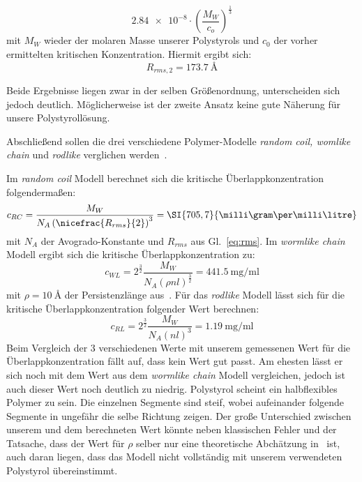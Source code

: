 \begin{equation}
    \num{2,84e-8} \cdot \left(\frac{M_W}{c_o}\right)^\frac{1}{3}
\end{equation}
mit $M_W$ wieder der molaren Masse unserer Polystyrols und $c_0$ der vorher ermittelten kritischen Konzentration. Hiermit ergibt sich:
\begin{equation*}
    R_{rms, 2} = \SI{173,7}{\angstrom}
\end{equation*}

Beide Ergebnisse liegen zwar in der selben Größenordnung, unterscheiden sich jedoch deutlich. Möglicherweise ist der zweite Ansatz keine gute Näherung für unsere Polystyrollösung.

Abschließend sollen die drei verschiedene Polymer-Modelle \textit{random coil, womlike chain} und \textit{rodlike} verglichen werden~\cite[]{regimes}. 

Im \textit{random coil} Modell berechnet sich die kritische Überlappkonzentration folgendermaßen:
\begin{equation}
    c_{RC} = \frac{M_W}{N_A \left(\nicefrac{R_{rms}}{2}\right)^3} = \SI{705,7}{\milli\gram\per\milli\litre}
\end{equation}
mit $N_A$ der Avogrado-Konstante und $R_{rms}$ aus Gl.~\ref{eq:rms}.
Im \textit{wormlike chain} Modell ergibt sich die kritische Überlappkonzentration zu:
\begin{equation}
    c_{WL} = 2^\frac{3}{2} \frac{M_W}{N_A \left(\rho n l\right)^\frac{3}{2}} = \SI{441,5}{\milli\gram\per\milli\litre}
\end{equation}
mit $\rho = \SI{10}{\angstrom}$ der Persistenzlänge aus~\cite{density}.
Für das \textit{rodlike} Modell lässt sich für die kritische Überlappkonzentration folgender Wert berechnen:
\begin{equation}
    c_{RL} = 2^\frac{3}{2} \frac{M_W}{N_A \left(nl\right)^3} = \SI{1,19}{\milli\gram\per\milli\litre}
\end{equation}
Beim Vergleich der 3 verschiedenen Werte mit unserem gemessenen Wert für die Überlappkonzentration fällt auf, dass kein Wert gut passt. Am ehesten lässt er sich noch mit dem Wert aus dem \textit{wormlike chain} Modell vergleichen, jedoch ist auch dieser Wert noch deutlich zu niedrig. Polystyrol scheint ein halbflexibles Polymer zu sein. Die einzelnen Segmente sind steif, wobei aufeinander folgende Segmente in ungefähr die selbe Richtung zeigen. 
Der große Unterschied zwischen unserem und dem berechneten Wert könnte neben klassischen Fehler und der Tatsache, dass der Wert für $\rho$ selber nur eine theoretische Abchätzung in~\cite{density} ist, auch daran liegen, dass das Modell nicht vollständig mit unserem verwendeten Polystyrol übereinstimmt.